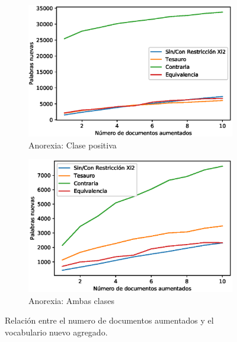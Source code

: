 \begin{figure}[hbt!]
    \begin{subfigure}[b]{0.5\textwidth}
        \includegraphics[width=\textwidth]{sections/figures/pos_plot_anox.eps}
        \caption{Anorexia: Clase positiva}
    \end{subfigure}
    \hfill
    \begin{subfigure}[b]{0.5\textwidth}
        \includegraphics[width=\textwidth]{sections/figures/both_plot_anox.eps}
        \caption{Anorexia: Ambas clases}
    \end{subfigure}
    
    
    \caption{Relación entre el numero de documentos aumentados y el vocabulario nuevo agregado.}
    \label{fig:aumento_vocab_dep}
\end{figure}